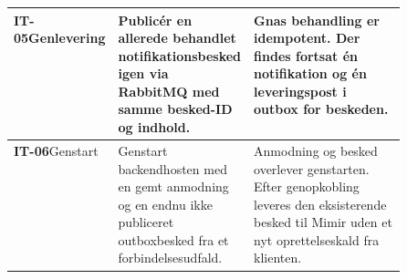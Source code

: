 \begin{table}[H]
\begin{tabularx}{\linewidth}{|
        >{\raggedright\arraybackslash}p{0.16\linewidth}|
        >{\raggedright\arraybackslash}p{0.34\linewidth}|
        >{\raggedright\arraybackslash}X|}
        \textbf{IT-05}\newline Genlevering &
        Publicér en allerede behandlet notifikationsbesked igen via
        RabbitMQ med samme besked-ID og indhold. &
        Gnas behandling er idempotent. Der findes fortsat én notifikation
        og én leveringspost i outbox for beskeden.
        \\ \hline

        \textbf{IT-06}\newline Genstart &
        Genstart backendhosten med en gemt anmodning og en endnu ikke
        publiceret outboxbesked fra et forbindelsesudfald. &
        Anmodning og besked overlever genstarten. Efter genopkobling
        leveres den eksisterende besked til Mimir uden et nyt
        oprettelseskald fra klienten.
        \\ \hline
    \end{tabularx}
\end{table}
